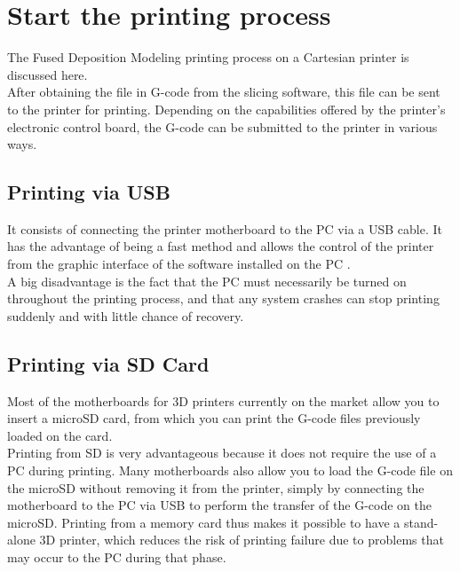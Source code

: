 \section{Start the printing process}
The Fused Deposition Modeling printing process on a Cartesian printer is discussed here. \\
After obtaining the file in G-code from the slicing software, this file can be sent to the printer for printing. Depending on the capabilities offered by the printer's electronic control board, the G-code can be submitted to the printer in various ways.

\subsection{Printing via USB}
It consists of connecting the printer motherboard to the PC via a USB cable.
It has the advantage of being a fast method and allows the control of the printer from the graphic interface of the software installed on the PC \parencite{Reference2}. \\
A big disadvantage is the fact that the PC must necessarily be turned on throughout the printing process, and that any system crashes can stop printing suddenly and with little chance of recovery.

\subsection{Printing via SD Card}
Most of the motherboards for 3D printers currently on the market allow you to insert a microSD card, from which you can print the G-code files previously loaded on the card. \\
Printing from SD is very advantageous because it does not require the use of a PC during printing.
Many motherboards also allow you to load the G-code file on the microSD without removing it from the printer, simply by connecting the motherboard to the PC via USB to perform the transfer of the G-code on the microSD.
Printing from a memory card thus makes it possible to have a stand-alone 3D printer, which reduces the risk of printing failure due to problems that may occur to the PC during that phase.

